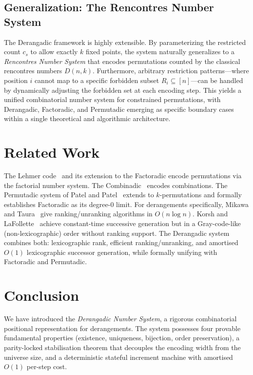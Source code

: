 \documentclass[11pt,a4paper]{article}
\begin{document}
    \subsection*{Generalization: The Rencontres Number System}
    The Derangadic framework is highly extensible. By parameterizing the
    restricted count $c_s$ to allow exactly $k$ fixed points, the system
    naturally generalizes to a \emph{Rencontres Number System} that encodes
    permutations counted by the classical rencontres numbers $D(n,k)$.
    Furthermore, arbitrary restriction patterns---where position $i$ cannot map
    to a specific forbidden subset $R_i \subseteq [n]$---can be handled by
    dynamically adjusting the forbidden set at each encoding step. This yields
    a unified combinatorial number system for constrained permutations, with
    Derangadic, Factoradic, and Permutadic emerging as specific boundary cases
    within a single theoretical and algorithmic architecture.

    \section{Related Work}
    \label{sec:related}

    The Lehmer code~\cite{lehmer1960} and its extension to the Factoradic
    encode permutations via the factorial number system.
    The Combinadic~\cite{knuth2011taocp} encodes combinations.
    The Permutadic system of Patel and Patel~\cite{permutadic} extends to
    $k$-permutations and formally establishes Factoradic as its degree-0 limit.
    For derangements specifically, Mikawa and Taura~\cite{mikawa2014} give
    ranking/unranking algorithms in $O(n \log n)$. Korsh and
    LaFollette~\cite{korsh2004} achieve constant-time successive generation
    but in a Gray-code-like (non-lexicographic) order without ranking support.
    The Derangadic system combines both: lexicographic rank, efficient
    ranking/unranking, and amortised $O(1)$ lexicographic successor generation,
    while formally unifying with Factoradic and Permutadic.

    \section{Conclusion}
    \label{sec:conclusion}

    We have introduced the \emph{Derangadic Number System}, a rigorous
    combinatorial positional representation for derangements. The system
    possesses four provable fundamental properties (existence, uniqueness,
    bijection, order preservation), a parity-locked stabilisation theorem that
    decouples the encoding width from the universe size, and a deterministic
    stateful increment machine with amortised $O(1)$ per-step cost.
\end{document}
